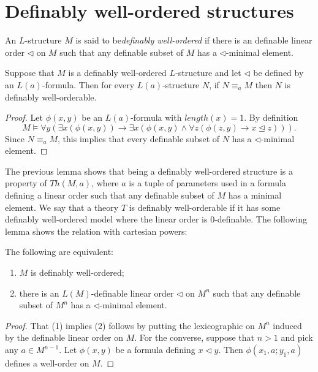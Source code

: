 \section{Definably well-ordered structures}\label{appendix}

\begin{defn}
An $L$-structure $M$ is said to be\emph{definably well-ordered} if there is an definable linear order $\lhd$ on $M$ such that any definable subset of $M$ has a $\lhd$-minimal element. 
\end{defn}

\begin{lem}\label{lem.elem} Suppose that $M$ is a definably well-ordered $L$-structure and let $\lhd$ be defined by an $L(a)$-formula. Then for every $L(a)$-structure $N$, if $N\equiv_a M$ then $N$ is definably well-orderable. 
\end{lem}

\begin{proof}
Let $\phi(x,y)$ be an $L(a)$-formula with $length(x)=1$. By definition 
\[M\models \forall y (\exists x (\phi(x,y))\to \exists x (\phi(x,y)\wedge \forall z (\phi(z,y)\to x\unlhd z))).
\]
Since $N\equiv_a M$, this implies that every definable subset of $N$ has a $\lhd$-minimal element.
\end{proof}

The previous lemma shows that being a definably well-ordered structure is a property of $Th(M,a)$, where $a$ is a tuple of parameters used in a formula defining a linear order such that any definable subset of $M$ has a minimal element. We say that a theory $T$ is definably well-orderable if it has some definably well-ordered model where the linear order is 0-definable. The following lemma shows the relation with cartesian powers:  

\begin{lem}\label{lem.cartesian} The following are equivalent:
\begin{enumerate}
	\item $M$ is definably well-ordered; 
	\item there is an $L(M)$-definable linear order $\lhd$ on $M^n$ such that any definable subset of $M^n$ has a $\lhd$-minimal element.
\end{enumerate}
\end{lem}

\begin{proof}
That (1) implies (2) follows by putting the lexicographic on $M^n$ induced by the definable linear order on $M$. For the converse, suppose that $n>1$ and pick any $a\in M^{n-1}$. Let $\phi(x,y)$ be a formula defining $x\lhd y$. Then $\phi(x_1,a;y_1,a)$ defines a well-order on $M$.  
\end{proof}

